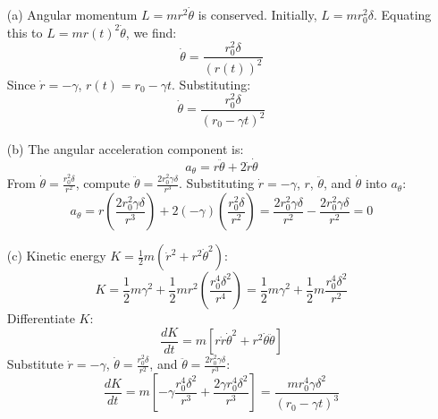 \documentclass{article}
\begin{document}
\begin{itemize}

\item[(a)] Angular momentum \( L = m r^2 \dot{\theta} \) is conserved. Initially, \( L = m r_0^2 \delta \). Equating this to \( L = m r(t)^2 \dot{\theta} \), we find:
\[
\dot{\theta} = \frac{r_0^2 \delta}{(r(t))^2}
\]
Since \( \dot{r} = -\gamma \), \( r(t) = r_0 - \gamma t \). Substituting:
\[
\dot{\theta} = \frac{r_0^2 \delta}{(r_0 - \gamma t)^2}
\]

\item[(b)] The angular acceleration component is:
\[
a_{\theta} = r \ddot{\theta} + 2 \dot{r} \dot{\theta}
\]
From \( \dot{\theta} = \frac{r_0^2 \delta}{r^2} \), compute \( \ddot{\theta} = \frac{2 r_0^2 \gamma \delta}{r^3} \). Substituting \( \dot{r} = -\gamma \), \( r \), \( \ddot{\theta} \), and \( \dot{\theta} \) into \( a_{\theta} \):
\[
a_{\theta} = r \left( \frac{2 r_0^2 \gamma \delta}{r^3} \right) + 2(-\gamma) \left( \frac{r_0^2 \delta}{r^2} \right) = \frac{2 r_0^2 \gamma \delta}{r^2} - \frac{2 r_0^2 \gamma \delta}{r^2} = 0
\]

\item[(c)] Kinetic energy \( K = \frac{1}{2} m (\dot{r}^2 + r^2 \dot{\theta}^2) \):
\[
K = \frac{1}{2} m \gamma^2 + \frac{1}{2} m r^2 \left( \frac{r_0^4 \delta^2}{r^4} \right) = \frac{1}{2} m \gamma^2 + \frac{1}{2} m \frac{r_0^4 \delta^2}{r^2}
\]
Differentiate \( K \):
\[
\frac{dK}{dt} = m \left[ r \dot{r} \dot{\theta}^2 + r^2 \dot{\theta} \ddot{\theta} \right]
\]
Substitute \( \dot{r} = -\gamma \), \( \dot{\theta} = \frac{r_0^2 \delta}{r^2} \), and \( \ddot{\theta} = \frac{2 r_0^2 \gamma \delta}{r^3} \):
\[
\frac{dK}{dt} = m \left[ -\gamma \frac{r_0^4 \delta^2}{r^3} + \frac{2 \gamma r_0^4 \delta^2}{r^3} \right] = \frac{m r_0^4 \gamma \delta^2}{(r_0 - \gamma t)^3}
\]
\end{itemize}
\end{document}
